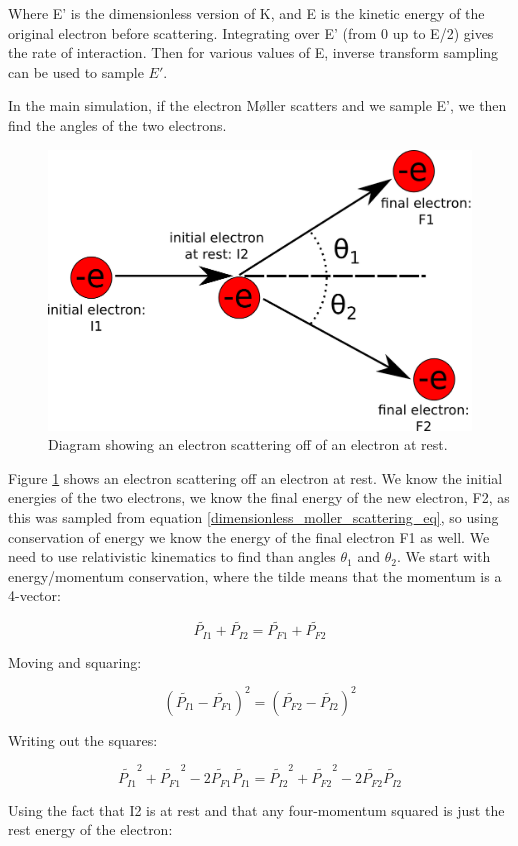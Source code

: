 \documentclass[]{article}
\begin{document}
Where E' is the dimensionless version of K, and E is the kinetic energy of the original electron before scattering. Integrating over E' (from 0 up to E/2) gives the rate of interaction. Then for various values of E, inverse transform sampling can be used to sample $E'$.

In the main simulation, if the electron M\o ller scatters and we sample E', we then find the angles of the two electrons.

\begin{figure}
\centering
\includegraphics[width=0.7\linewidth]{./figures/moller_kinematics/scattering_kinematics}
\caption{Diagram showing an electron scattering off of an electron at rest.}
\label{scattering_kin_fig}
\end{figure}

Figure \ref{scattering_kin_fig} shows an electron scattering off an electron at rest. We know the initial energies of the two electrons, we know the final energy of the new electron, F2, as this was sampled from equation \ref{dimensionless_moller_scattering_eq}, so using conservation of energy we know the energy of the final electron F1 as well. We need to use relativistic kinematics to find than angles $\theta_1$ and $\theta_2$. We start with energy/momentum conservation, where the tilde means that the momentum is a 4-vector:

\[ 
\tilde{P_{I1}}+\tilde{P_{I2}}=\tilde{P_{F1}}+\tilde{P_{F2}}
\]

Moving and squaring:

\[ 
(\tilde{P_{I1}}-\tilde{P_{F1}})^2=(\tilde{P_{F2}}-\tilde{P_{I2}})^2
\]

Writing out the squares:

\[ 
\tilde{P_{I1}}^2 + \tilde{P_{F1}}^2 - 2\tilde{P_{F1}}\tilde{P_{I1}}=\tilde{P_{I2}}^2 + \tilde{P_{F2}}^2 - 2\tilde{P_{F2}}\tilde{P_{I2}}
\]

Using the fact that I2 is at rest and that any four-momentum squared is just the rest energy of the electron:
\end{document}
